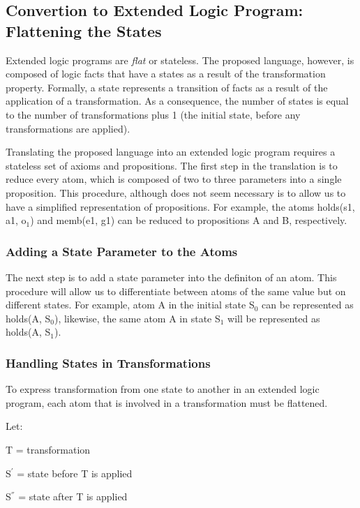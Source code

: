 \documentclass[a4paper]{article}
\begin{document}
    \subsection{Convertion to Extended Logic Program: Flattening the States}

      Extended logic programs are \emph{flat} or stateless. The proposed
      language, however, is composed of logic facts that have a states as
      a result of the transformation property. Formally, a state represents
      a transition of facts as a result of the application of a transformation.
      As a consequence, the number of states is equal to the number of
      transformations plus 1 (the initial state, before any transformations
      are applied).

      Translating the proposed language into an extended logic program requires
      a stateless set of axioms and propositions. The first step in the 
      translation is to reduce every atom, which is composed of two to three
      parameters into a single proposition. This procedure, although does not
      seem necessary is to allow us to have a simplified representation of
      propositions. For example, the atoms holds(s1, a1, o$_{1}$) and memb(e1, g1)
      can be reduced to propositions A and B, respectively.

      \subsubsection{Adding a State Parameter to the Atoms}

        The next step is to add a state parameter into the definiton of an
        atom. This procedure will allow us to differentiate between atoms of
        the same value but on different states. For example, atom A in 
        the initial state S$_0$ can be represented as holds(A, S$_0$),
        likewise, the same atom A in state S$_1$ will be represented as
        holds(A, S$_1$).

      \subsubsection{Handling States in Transformations}

        To express transformation from one state to another in an extended
        logic program, each atom that is involved in a transformation must
        be flattened.

        Let:
  
        \begin{list}{}{}
          \item T = transformation
          \item S$^{'}$ = state before T is applied
          \item S$^{''}$ = state after T is applied
        \end{list}
  
\end{document}
